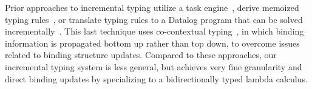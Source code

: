\documentclass[acmsmall,dvipsnames,10pt,nonacm,sigplan]{acmart}\settopmatter{printfolios=true}
\begin{document}
Prior approaches to incremental typing utilize a task engine~\cite{DBLP:conf/sle/WachsmuthKVGV13}, derive memoized typing rules~\cite{DBLP:conf/nfm/BusiDG19}, or translate typing rules to a Datalog program that can be solved incrementally~\cite{DBLP:conf/kbse/SzaboEV16, DBLP:journals/pacmpl/PacakES20}. This last technique uses co-contextual typing~\cite{DBLP:conf/oopsla/ErdwegBKKM15}, in which binding information is propagated bottom up rather than top down, to overcome issues related to binding structure updates. Compared to these approaches, our incremental typing system is less general, but achieves very fine granularity and direct binding updates by specializing to a bidirectionally typed lambda calculus.  





\thispagestyle{plain}
\end{document}
